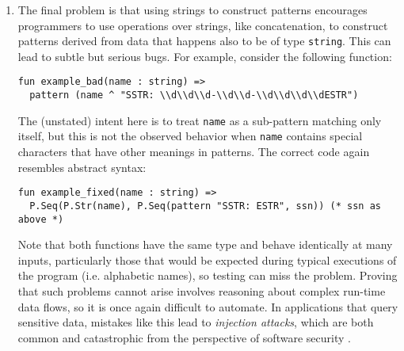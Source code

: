 \begin{enumerate}
\item The final problem is that using strings to construct patterns encourages programmers to use  operations over strings, like concatenation, to construct patterns derived from data that happens also to be of type \lstinline{string}. This can lead to subtle but serious bugs. For example, consider the following function:
\begin{lstlisting}[numbers=none,escapechar=|]
fun example_bad(name : string) => 
  pattern (name ^ "SSTR: \\d\\d\\d-\\d\\d-\\d\\d\\d\\dESTR")
\end{lstlisting}
The (unstated) intent here is to treat \lstinline{name} as a sub-pattern matching only itself, but this is not the observed behavior when \lstinline{name} contains special characters that have other meanings in patterns. The correct code again resembles abstract syntax: 
\begin{lstlisting}[numbers=none]
fun example_fixed(name : string) => 
  P.Seq(P.Str(name), P.Seq(pattern "SSTR: ESTR", ssn)) (* ssn as above *)
\end{lstlisting}
Note that both functions have the same type and behave identically at many inputs, particularly those that would be expected during typical executions of the program (i.e. alphabetic names), so testing can miss the problem. Proving that such problems cannot arise involves reasoning about complex run-time data flows, so it is once again difficult to automate. 
In applications that query sensitive data, mistakes like this lead to \emph{injection attacks}, which are both common and catastrophic from the perspective of software security \cite{owasp2013}. %

\end{enumerate}


